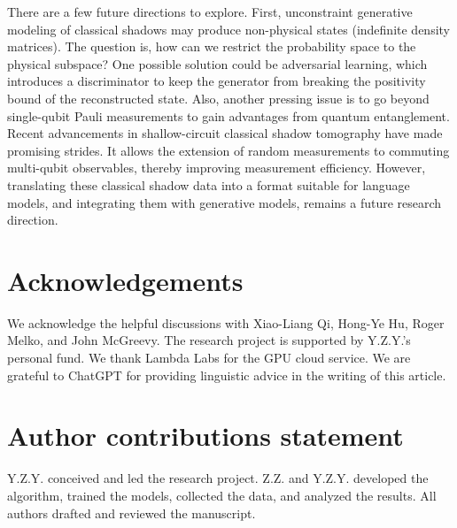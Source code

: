 \documentclass[fleqn,11pt]{wlscirep}
\begin{document}
There are a few future directions to explore. First, unconstraint generative modeling of classical shadows may produce non-physical states (indefinite density matrices). The question is, how can we restrict the probability space to the physical subspace? One possible solution could be adversarial learning, which introduces a discriminator to keep the generator from breaking the positivity bound of the reconstructed state. Also, another pressing issue is to go beyond single-qubit Pauli measurements to gain advantages from quantum entanglement. Recent advancements in shallow-circuit classical shadow tomography\cite{Hu2022H2102.10132, Hu2023C2107.04817, Akhtar2023S2209.02093, Bertoni2022S2209.12924, Ippoliti2023O2212.11963} have made promising strides. It allows the extension of random measurements to commuting multi-qubit observables, thereby improving measurement efficiency. However, translating these classical shadow data into a format suitable for language models, and integrating them with generative models, remains a future research direction.







\section*{Acknowledgements}

We acknowledge the helpful discussions with Xiao-Liang Qi, Hong-Ye Hu, Roger Melko, and John McGreevy. The research project is supported by Y.Z.Y.'s personal fund. We thank Lambda Labs for the GPU cloud service. We are grateful to ChatGPT for providing linguistic advice in the writing of this article.

\section*{Author contributions statement}

Y.Z.Y. conceived and led the research project. Z.Z. and Y.Z.Y. developed the algorithm, trained the models, collected the data, and analyzed the results. All authors drafted and reviewed the manuscript. 
\end{document}
